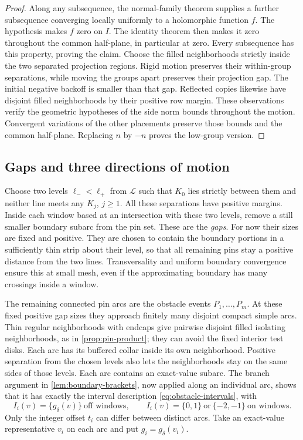 \begin{proof}
Along any subsequence, the normal-family theorem supplies a further
subsequence converging locally uniformly to a holomorphic function
$f$.  The hypothesis makes $f$ zero on $I$.  The identity theorem
then makes it zero throughout the common half-plane, in particular
at zero.  Every subsequence has this property, proving the claim.
Choose the filled neighborhoods strictly inside the two separated
projection regions.  Rigid motion preserves their within-group
separations, while moving the groups apart preserves their projection
gap.  The initial negative backoff is smaller than that gap.  Reflected
copies likewise have disjoint filled neighborhoods by their positive
row margin.  These observations verify the geometric hypotheses of
the side norm bounds throughout the motion.  Convergent variations of
the other placements preserve those bounds and the common half-plane.  Replacing $n$ by $-n$
proves the low-group version.
\end{proof}

\subsection{Gaps and three directions of motion}

Choose two levels $\ell_-<\ell_+$ from $\mathcal L$ such that
$K_0$ lies strictly between them and neither line meets any
$K_j$, $j\ge1$.  All these separations have positive margins.
Inside each window based at an intersection with these two levels,
remove a still smaller boundary subarc from the pin set.  These are
the \emph{gaps}.  For now their sizes are fixed and positive.  They
are chosen to contain the boundary portions in a sufficiently thin
strip about their level, so that all remaining pins stay a positive
distance from the two lines.  Transversality and uniform boundary
convergence ensure this at small mesh, even if the approximating
boundary has many crossings inside a window.

The remaining connected pin arcs are the obstacle events
$P_1,\ldots,P_m$.  At these fixed positive gap sizes they approach
finitely many disjoint compact simple arcs.  Thin regular neighborhoods
with endcaps give pairwise disjoint filled isolating neighborhoods, as
in \cref{prop:pin-product}; they can avoid the fixed interior test disks.
Each arc has its buffered collar inside its own neighborhood.  Positive
separation from the chosen levels also lets the neighborhoods stay on
the same sides of those levels.  Each arc contains an exact-value subarc.  The branch argument in
\cref{lem:boundary-brackets}, now applied along an individual arc,
shows that it has exactly the interval description
\eqref{eq:obstacle-intervals}, with
\[
 I_i(v)=\{g_\delta(v)\}\ \text{off windows},\qquad
 I_i(v)=\{0,1\}\ \text{or}\ \{-2,-1\}\ \text{on windows}.
\]
Only the integer offset $t_i$ can differ between distinct arcs.
Take an exact-value representative $v_i$ on each arc and put
$g_i=g_\delta(v_i)$.

